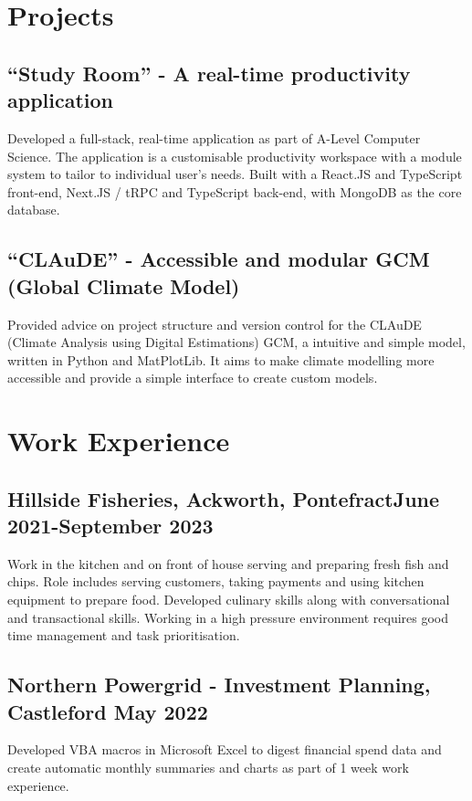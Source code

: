 \documentclass[9pt]{extarticle}
\begin{document}
\begin{minipage}{0.6\textwidth}
	\raggedright
	\section{Projects}
	\subsection{``Study Room'' - A real-time productivity application}
	Developed a full-stack, real-time application as part of A-Level Computer Science.
	The application is a customisable productivity workspace with a module system to tailor to individual user's needs.
	Built with a React.JS and TypeScript front-end, Next.JS / tRPC and TypeScript back-end, with MongoDB as the core database.
	\vspace{.3cm}
	\subsection{``CLAuDE'' - Accessible and modular GCM (Global Climate Model)}
	Provided advice on project structure and version control for the CLAuDE (Climate Analysis using Digital Estimations) GCM, a intuitive and simple model, written in Python and MatPlotLib.
	It aims to make climate modelling more accessible and provide a simple interface to create custom models.

	\vspace{.3cm}
	\section{Work Experience}
	\subsection{Hillside Fisheries, Ackworth, Pontefract\hfill June 2021-September 2023}
	Work in the kitchen and on front of house serving and preparing fresh fish and chips. Role includes serving customers, taking payments and using kitchen equipment to prepare food. Developed culinary skills along with conversational and transactional skills. Working in a high pressure environment requires good time management and task prioritisation.

	\vspace{.3cm}

	\subsection{Northern Powergrid - Investment Planning, Castleford \hfill May 2022}
	Developed VBA macros in Microsoft Excel to digest financial spend data and create automatic monthly summaries and charts as part of 1 week work experience.
	\vspace{.3cm}


\end{minipage}
\end{document}
